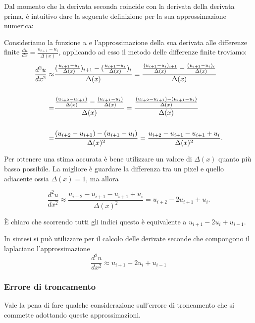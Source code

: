 \vspace{1em}
Dal momento che la derivata seconda coincide con la derivata della derivata prima, è intuitivo dare la seguente definizione per la sua approssimazione numerica:
\begin{definizione}
\noindent
Consideriamo la funzione $u$ e l'approssimazione della sua derivata alle differenze finite $\frac{du}{dx}=\frac{u_{i+1} - u_i}{\Delta(x)}$, applicando ad esso il metodo delle differenze finite troviamo: 
\begin{align*}
\frac{d^2u}{dx^2} \approx &
\frac{
(\frac{u_{i+1} - u_i}{\Delta(x)})_{i+1} 
- 
(\frac{u_{i+1} - u_i}{\Delta(x)})_i
}{\Delta(x)}
=
\frac{
\frac{(u_{i+1} - u_i)_{i+1}}{\Delta(x)} 
-   
\frac{(u_{i+1} - u_i)_i}{\Delta(x)}
}{\Delta(x)}
\\
\vline&
\\
= &
\frac{
\frac{(u_{i+2} - u_{i+1})}{\Delta(x)} 
- 
\frac{(u_{i+1} - u_i)}{\Delta(x)}
}{\Delta(x)}
=
\frac{
\frac{(u_{i+2} - u_{i+1}) 
- 
(u_{i+1} - u_i)}{\Delta(x)}
}{\Delta(x)}
\\
\vline
\\
= &
\frac{
(u_{i+2} - u_{i+1}) 
- 
(u_{i+1} - u_i)}
{\Delta(x)^2}
=
\frac{
 u_{i+2} - u_{i+1} 
-u_{i+1} + {u_i}}
{\Delta(x)^2}
.\\
\end{align*}
\raggedright
\end{definizione}
\begin{osservazione}
Per ottenere una stima accurata è bene utilizzare un valore di $\Delta(x)$ quanto più basso possibile. La migliore è guardare la differenza tra un pixel e quello adiacente ossia $\Delta(x)=1$, ma allora 

$$\frac{d^2u}{dx^2} \approx
\frac{
 u_{i+2} - u_{i+1} 
-u_{i+1} + u_i}
{\Delta(x)^2} = u_{i+2} -2 u_{i+1} + u_i.$$

\`E chiaro che scorrendo tutti gli indici questo è equivalente a $u_{i+1} -2 u_i + u_{i-1}.$
\end{osservazione}

In sintesi si può utilizzare per il calcolo delle derivate seconde che compongono il laplaciano l'approssimazione\\
$$\frac{d^2u}{dx^2} \approx u_{i+1} -2 u_i + u_{i-1}$$
\newpage
\subsubsection{Errore di troncamento}

Vale la pena di fare qualche considerazione sull'errore di troncamento che si commette adottando queste approssimazioni.\\

